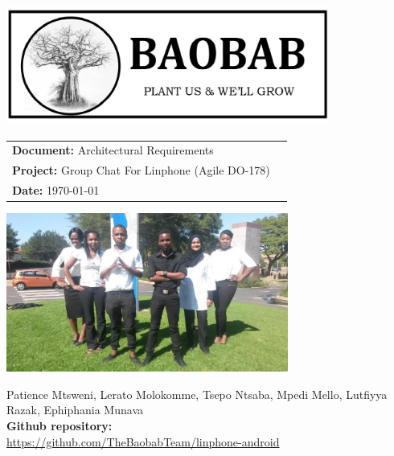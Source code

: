 
\begin{titlepage}

\begin{center}

\includegraphics[width=400px]{pictures/logo.jpg}
\vspace{1 cm}
\begin{flushright} \large
\begin{tabular}{lr}
\vspace{1 cm}
\LARGE\textbf{Document:} Architectural Requirements\\
\vspace{1 cm}
\LARGE\textbf{Project:} Group Chat For Linphone (Agile DO-178)\\
\LARGE\textbf{Date: }\today\\
\end{tabular}
\end{flushright}

\centering \includegraphics[width=350px]{pictures/Team.jpg}

Patience Mtsweni, Lerato Molokomme, Tsepo Ntsaba, Mpedi Mello, Lutfiyya Razak, Ephiphania Munava\\
\vspace{1 cm}
\large\textbf{Github repository: } \\
\url{https://github.com/TheBaobabTeam/linphone-android}

\end{center}
\end{titlepage}